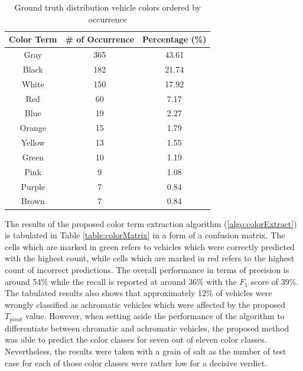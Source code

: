 \begin{table}[bht!]
\centering
\caption{Ground truth distribution vehicle colors ordered by occurrence}
\label{table:colorDist}
\begin{tabular}{ccc}
\toprule
Color Term & \# of Occurrence & Percentage (\%)   \\
\midrule
Gray       & 365       & 43.61  \\
Black      & 182       & 21.74  \\
White      & 150       & 17.92  \\
Red        & 60        & 7.17   \\
Blue       & 19        & 2.27   \\
Orange     & 15        & 1.79   \\
Yellow     & 13        & 1.55   \\
Green      & 10        & 1.19   \\
Pink       & 9         & 1.08   \\
Purple     & 7         & 0.84   \\
Brown      & 7         & 0.84   \\
\bottomrule
\end{tabular}
\end{table}




The results of the proposed color term extraction algorithm (\ref{algo:colorExtract}) is tabulated in Table \ref{table:colorMatrix} in a form of a confusion matrix. The cells which are marked in green refers to vehicles which were correctly predicted with the highest count, while cells which are marked in red refers to the highest count of incorrect predictions. The overall performance in terms of precision is around 54\% while the recall is reported at around 36\% with the $F_1$ score of 39\%. The tabulated results also shows that approximately 12\% of vehicles were wrongly classified as achromatic vehicles which were affected by the proposed $T_{pivot}$ value. However, when setting aside the performance of the algorithm to differentiate between chromatic and achromatic vehicles, the proposed method was able to predict the color classes for seven out of eleven color classes. Nevertheless, the results were taken with a grain of salt as the number of test case for each of those color classes were rather low for a decisive verdict. 

